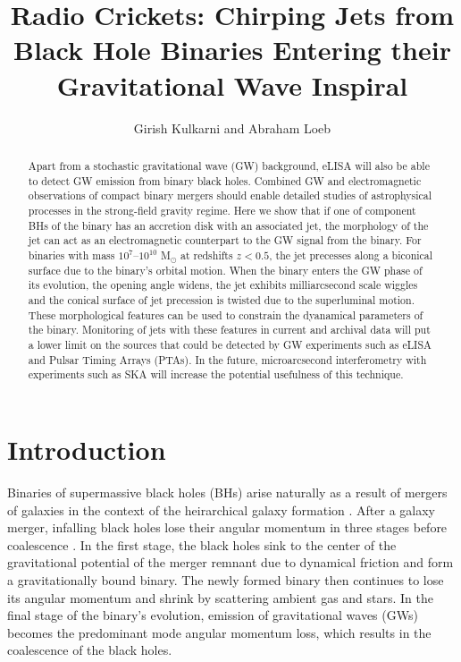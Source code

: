 \documentclass[iop]{emulateapj}
\begin{document}
\title{Radio Crickets: Chirping Jets from Black Hole Binaries Entering
  their Gravitational Wave Inspiral} \author{Girish
  Kulkarni and Abraham Loeb}
 

\begin{abstract}
Apart from a stochastic gravitational wave (GW) background, eLISA will
also be able to detect GW emission from binary black holes.  Combined
GW and electromagnetic observations of compact binary mergers should
enable detailed studies of astrophysical processes in the strong-field
gravity regime.  Here we show that if one of component BHs of the
binary has an accretion disk with an associated jet, the morphology of
the jet can act as an electromagnetic counterpart to the GW signal
from the binary.  For binaries with mass $10^7$--$10^{10}$ M$_\odot$
at redshifts $z<0.5$, the jet precesses along a biconical surface due
to the binary's orbital motion.  When the binary enters the GW phase
of its evolution, the opening angle widens, the jet exhibits
milliarcsecond scale wiggles and the conical surface of jet precession
is twisted due to the superluminal motion.  These morphological
features can be used to constrain the dyanamical parameters of the
binary.  Monitoring of jets with these features in current and
archival data will put a lower limit on the sources that could be
detected by GW experiments such as eLISA and Pulsar Timing Arrays
(PTAs).  In the future, microarcsecond interferometry with experiments
such as SKA will increase the potential usefulness of this technique.  
\end{abstract}


\section{Introduction}
\label{sec:intro}

Binaries of supermassive black holes (BHs) arise naturally as a result
of mergers of galaxies in the context of the heirarchical galaxy
formation \citep{2000MNRAS.311..576K, 2002MNRAS.336L..61H,
  2008ApJ...676...33D, 2012MNRAS.422.1306K}.  After a galaxy merger,
infalling black holes lose their angular momentum in three stages
before coalescence \citep{1980Natur.287..307B, 2005LRR.....8....8M,
  2011ASL.....4..181C}.  In the first stage, the black holes sink to
the center of the gravitational potential of the merger remnant due to
dynamical friction and form a gravitationally bound binary.  The newly
formed binary then continues to lose its angular momentum and shrink
by scattering ambient gas and stars.  In the final stage of the
binary's evolution, emission of gravitational waves (GWs) becomes the
predominant mode angular momentum loss, which results in the
coalescence of the black holes.
\end{document}
